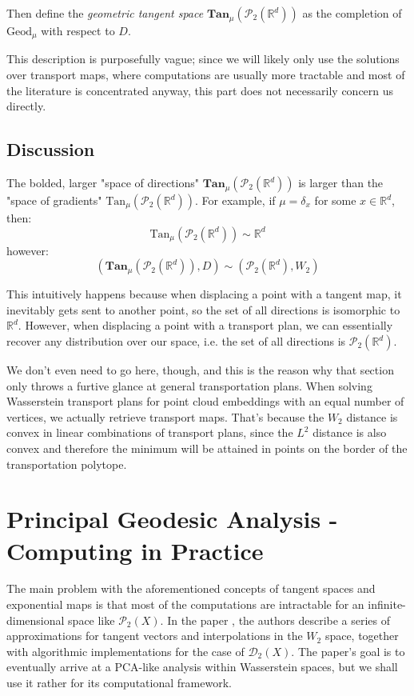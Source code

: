 \documentclass{article}
\begin{document}
Then define the \textit{geometric tangent space} $\textbf{Tan}_\mu(\mathscr{P}_2(\mathbb{R}^d))$
as the completion of $\text{Geod}_\mu$ with respect to $D$.

This description is purposefully vague; since we will likely only use the solutions
over transport maps, where computations are usually more tractable and most of 
the literature is concentrated anyway, this part does not necessarily concern 
us directly.

\subsection{Discussion}

The bolded, larger "space of directions" $\textbf{Tan}_\mu(\mathscr{P}_2(\mathbb{R}^d))$ 
is larger than the "space of gradients" $\text{Tan}_\mu(\mathscr{P}_2(\mathbb{R}^d))$.
For example, if $\mu = \delta_x$ for some $x\in \mathbb{R}^d$, then:
\[\text{Tan}_\mu(\mathscr{P}_2(\mathbb{R}^d)) \sim \mathbb{R}^d \]  
however:
\[(\textbf{Tan}_\mu(\mathscr{P}_2(\mathbb{R}^d)), D) \sim (\mathscr{P}_2(\mathbb{R}^d), W_2)  \]

This intuitively happens because when displacing a point with a tangent map,
it inevitably gets sent to another point, so the set of all directions is isomorphic to
$\mathbb{R}^d$. However, when displacing a point with a transport plan, we can
essentially recover any distribution over our space, i.e. the set of all 
directions is $\mathscr{P}_2(\mathbb{R}^d)$.

We don't even need to go here, though, and this is the reason why that section 
only throws a furtive glance at general transportation plans. When solving Wasserstein 
transport plans for point cloud embeddings with an equal number of vertices, we actually 
retrieve transport maps. That's because the $W_2$ distance is convex in linear 
combinations of transport plans, since the $L^2$ distance is also convex
and therefore the minimum will be attained in points on the border of 
the transportation polytope.

\section{Principal Geodesic Analysis - Computing in Practice}
The main problem with the aforementioned concepts of tangent spaces and exponential maps
is that most of the computations
are intractable for an infinite-dimensional space like $\mathscr{P}_2(X)$. In the paper
\cite{seguycuturi2015}, the authors describe a series of approximations for 
tangent vectors and interpolations in the $W_2$ space, together with algorithmic
implementations for the case of $\mathscr{D}_2(X)$. The paper's goal is 
to eventually arrive at a PCA-like analysis within Wasserstein spaces, but 
we shall use it rather for its computational framework.
\end{document}
